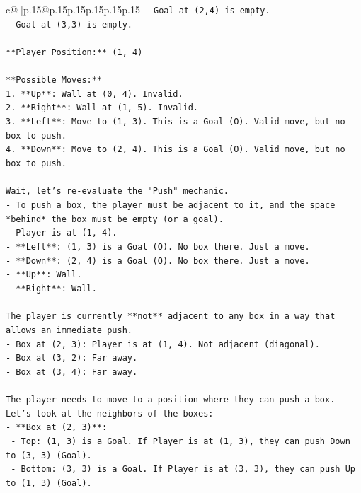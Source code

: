 \documentclass{article}
\begin{document}
{\begin{supertabular}{c@{$\;$}|p{.15\linewidth}@{}p{.15\linewidth}p{.15\linewidth}p{.15\linewidth}p{.15\linewidth}p{.15\linewidth}}
{{{\texttt{{-} Goal at (2,4) is empty.} \\
\texttt{{-} Goal at (3,3) is empty.} \\
\\ 
\texttt{**Player Position:** (1, 4)} \\
\\ 
\texttt{**Possible Moves:**} \\
\texttt{1. **Up**: Wall at (0, 4). Invalid.} \\
\texttt{2. **Right**: Wall at (1, 5). Invalid.} \\
\texttt{3. **Left**: Move to (1, 3). This is a Goal (O). Valid move, but no box to push.} \\
\texttt{4. **Down**: Move to (2, 4). This is a Goal (O). Valid move, but no box to push.} \\
\\ 
\texttt{Wait, let's re{-}evaluate the "Push" mechanic.} \\
\texttt{{-} To push a box, the player must be adjacent to it, and the space *behind* the box must be empty (or a goal).} \\
\texttt{{-} Player is at (1, 4).} \\
\texttt{{-} **Left**: (1, 3) is a Goal (O). No box there. Just a move.} \\
\texttt{{-} **Down**: (2, 4) is a Goal (O). No box there. Just a move.} \\
\texttt{{-} **Up**: Wall.} \\
\texttt{{-} **Right**: Wall.} \\
\\ 
\texttt{The player is currently **not** adjacent to any box in a way that allows an immediate push.} \\
\texttt{{-} Box at (2, 3): Player is at (1, 4). Not adjacent (diagonal).} \\
\texttt{{-} Box at (3, 2): Far away.} \\
\texttt{{-} Box at (3, 4): Far away.} \\
\\ 
\texttt{The player needs to move to a position where they can push a box.} \\
\texttt{Let's look at the neighbors of the boxes:} \\
\texttt{{-} **Box at (2, 3)**:} \\
\texttt{  {-} Top: (1, 3) is a Goal. If Player is at (1, 3), they can push Down to (3, 3) (Goal).} \\
\texttt{  {-} Bottom: (3, 3) is a Goal. If Player is at (3, 3), they can push Up to (1, 3) (Goal).} \\
}}}
\end{supertabular}}
\end{document}
